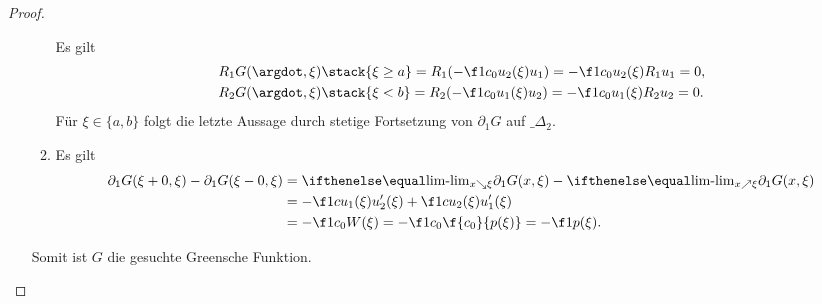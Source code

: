 \begin{st}
\begin{proof}
\begin{seg}[(ii)$\implies$(i)]
\begin{itemize}
\begin{enumerate}[1)]
							Es gilt
							\begin{align*}
								R_1 G(\argdot, \xi) &\stack{\xi \ge a}= R_1 (-\f 1{c_0} u_2(\xi) u_1) = -\f 1{c_0} u_2(\xi) R_1u_1 = 0, \\
								R_2 G(\argdot, \xi) &\stack{\xi < b}= R_2 (-\f 1{c_0} u_1(\xi) u_2) = -\f 1{c_0} u_1(\xi) R_2u_2 = 0.
							\end{align*}
							Für $\xi \in \{a,b\}$ folgt die letzte Aussage durch stetige Fortsetzung von $\partial_1 G $ auf $\_{\Delta_2}$.
						\item
							Es gilt
							\begin{align*}
								\partial_1 G(\xi + 0, \xi) - \partial_1 G(\xi - 0, \xi)
								&= \lim_{x \searrow \xi} \partial_1 G(x, \xi) - \lim_{x \nearrow \xi} \partial_1 G(x,\xi) \\
								&= - \f 1{c} u_1(\xi) u_2'(\xi) + \f 1c u_2(\xi) u_1'(\xi) \\
								&= - \f 1{c_0} W(\xi)
								= - \f 1{c_0} \f {c_0}{p(\xi)} = - \f 1{p(\xi)}.
							\end{align*}
					\end{enumerate}
					Somit ist $G$ die gesuchte Greensche Funktion.
			\end{itemize}
		\end{seg}
	\end{proof}
\end{st}

